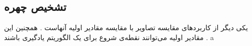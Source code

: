 \begin{figure}
  \centering
  \caption{}
  \label{fig:img-denoise}
\end{figure}

\subsection{تشخیص چهره}
یکی دیگر از کاربرد‌های
مقایسه تصاویر با مقایسه مقادیر اولیه آنهاست
\cite{TAI20161}
.
همچنین این مقادیر اولیه می‌توانند نقطه‌ی شروع برای یک الگوریتم یادگیری باشند
\cite{5539989}
.
a
